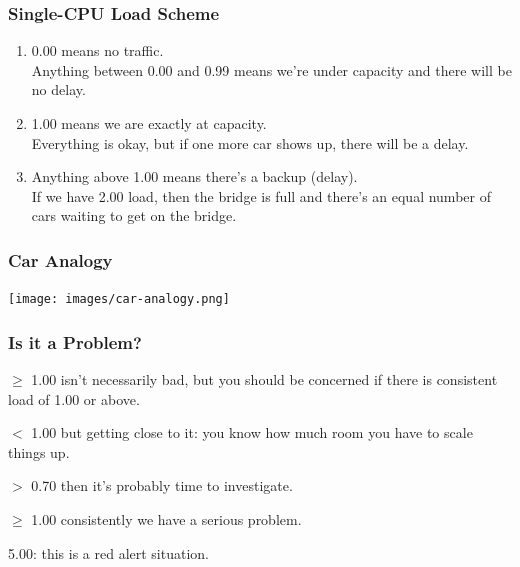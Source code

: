 \begin{frame}
\frametitle{Single-CPU Load Scheme}


\begin{changemargin}{1cm}
\begin{enumerate}
	\item 0.00 means no traffic. \\
    Anything between 0.00 and 0.99 means we're under capacity and there will be no delay.\\[1em]
	\item 1.00 means we are exactly at capacity. \\
    Everything is okay, but if one more car shows up, there will be a delay.\\[1em]
	\item Anything above 1.00 means there's a backup (delay). \\
    If we have 2.00 load, then the bridge is full and there's an equal number of cars waiting to get on the bridge. 
\end{enumerate}
\end{changemargin}

\end{frame}



\begin{frame}
\frametitle{Car Analogy}

\begin{center}
	\texttt{[image: images/car-analogy.png]}
\end{center}

\end{frame}



\begin{frame}
\frametitle{Is it a Problem?}


\begin{changemargin}{1cm}
$\ge$ 1.00 isn't necessarily bad, but you should be concerned if there is consistent load of 1.00 or above. 

$<$ 1.00 but getting close to it: you know how much room you have to scale things up.

$>$ 0.70 then it's probably time to investigate.

$\ge$ 1.00 consistently we have a serious problem. 

5.00: this is a red alert situation.
\end{changemargin}

\end{frame}



